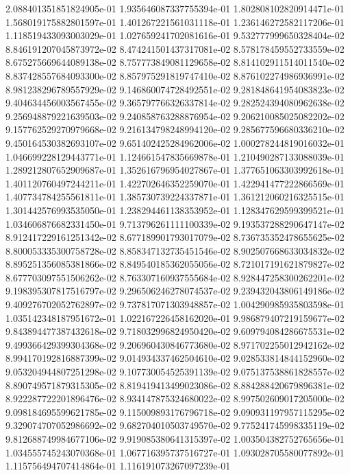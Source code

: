 2.088401351851824905e-01
1.935646087337755394e-01
1.802808102820914471e-01
1.568019175882801597e-01
1.401267221561031118e-01
1.236146272582117206e-01
1.118519433093003029e-01
1.027659241702081616e-01
9.532777999650328404e-02
8.846191207045873972e-02
8.474241501437317081e-02
8.578178459552733559e-02
8.675275669644089138e-02
8.757773849081129658e-02
8.814102911514011540e-02
8.837428557684093300e-02
8.857975291819747410e-02
8.876102274986936991e-02
8.981238296789557929e-02
9.146860074728492551e-02
9.281848641954083823e-02
9.404634456003567455e-02
9.365797766326337814e-02
9.282524394080962638e-02
9.256948879221639503e-02
9.240858763288876954e-02
9.206210085025082202e-02
9.157762529270979668e-02
9.216134798248994120e-02
9.285677596680336210e-02
9.450164530382693107e-02
9.651402425284962006e-02
1.000278244819016032e-01
1.046699228129443771e-01
1.124661547835669878e-01
1.210490287133088039e-01
1.289212807652909687e-01
1.352616796954027867e-01
1.377651063303992618e-01
1.401120760497244211e-01
1.422702646352259070e-01
1.422941477222866569e-01
1.407734784255561811e-01
1.385730739224337871e-01
1.361212060216325515e-01
1.301442576993535050e-01
1.238294461138353952e-01
1.128347629599399521e-01
1.034606876682331450e-01
9.713796261111100339e-02
9.193537288290647147e-02
8.912417229161251342e-02
8.677189901793017079e-02
8.736735352478655625e-02
8.800053335300758728e-02
8.858347132735451546e-02
8.902507668633034832e-02
8.895251356085381866e-02
8.849540185362055056e-02
8.721017191621879827e-02
8.677703097551506262e-02
8.763307160937555684e-02
8.928447258300262201e-02
9.198395307817516797e-02
9.296506246278074537e-02
9.239432043806149186e-02
9.409276702052762897e-02
9.737817071303948857e-02
1.004290985935803598e-01
1.035142348187951672e-01
1.022167226458162020e-01
9.986879407219159677e-02
9.843894477387432618e-02
9.718032996824950420e-02
9.609794084286675531e-02
9.499366429399304368e-02
9.206960430846773680e-02
8.971702255012942162e-02
8.994170192816887399e-02
9.014934337462504610e-02
9.028533814844152960e-02
9.053204944807251298e-02
9.107730054525391139e-02
9.075137538861828557e-02
8.890749571879315305e-02
8.819419413499023086e-02
8.884288420679896381e-02
8.922287722201896476e-02
8.934147875324680022e-02
8.997502609017205000e-02
9.098184695599621785e-02
9.115009893176796718e-02
9.090931197957115295e-02
9.329074707052986692e-02
9.682704010503749570e-02
9.775241745998335119e-02
9.812688749984677106e-02
9.919085380641315397e-02
1.003504382752765656e-01
1.034555745243070368e-01
1.067716395737516727e-01
1.093028705580077892e-01
1.115756494707414864e-01
1.116191073267097239e-01
